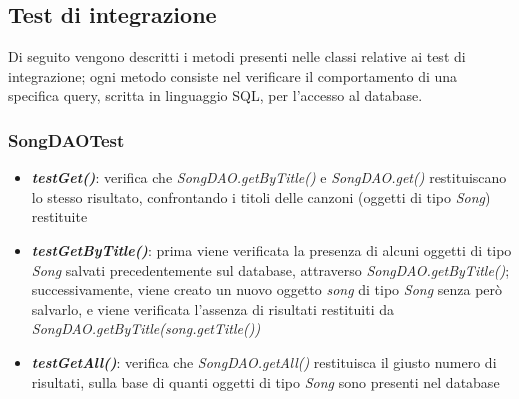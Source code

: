 \documentclass{article}
\begin{document}
  \subsection{Test di integrazione}
  Di seguito vengono descritti i metodi presenti nelle classi relative ai test di integrazione; ogni metodo consiste nel verificare il comportamento di una specifica query, scritta in linguaggio SQL, per l'accesso al database.


  \subsubsection{SongDAOTest}
  \begin{itemize}

    \item \textbf{\textit{testGet()}}: verifica che \textit{SongDAO.getByTitle()} e \textit{SongDAO.get()} restituiscano lo stesso risultato, confrontando i titoli delle canzoni (oggetti di tipo \textit{Song}) restituite

    \item \textbf{\textit{testGetByTitle()}}: prima viene verificata la presenza di alcuni oggetti di tipo \textit{Song} salvati precedentemente sul database, attraverso \textit{SongDAO.getByTitle()}; successivamente, viene creato un nuovo oggetto \textit{song} di tipo \textit{Song} senza però salvarlo, e viene verificata l'assenza di risultati restituiti da \textit{SongDAO.getByTitle(song.getTitle())}

    \item \textbf{\textit{testGetAll()}}: verifica che \textit{SongDAO.getAll()} restituisca il giusto numero di risultati, sulla base di quanti oggetti di tipo \textit{Song} sono presenti nel database

  \end{itemize}
\end{document}
